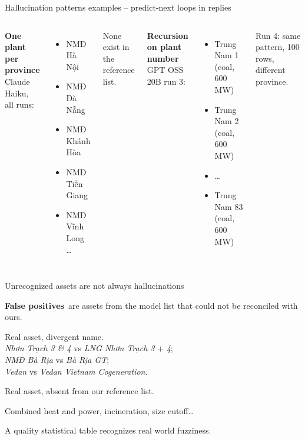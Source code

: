 \documentclass[aspectratio=169]{beamer}
\begin{document}
\begin{frame}{Hallucination patterns examples -- predict-next loops in replies}

\begin{columns}[T]
\textbf{One plant per province}\\
{\small Claude Haiku, all runs:}
\begin{itemize}\setlength\itemsep{1pt}
  \item{\small NMĐ Hà Nội}
  \item{\small NMĐ Đà Nẵng}
  \item{\small NMĐ Khánh Hòa}
  \item{\small NMĐ Tiền Giang}
  \item{\small NMĐ Vĩnh Long \ldots}
\end{itemize}
{\small None exist in the reference list.}

\textbf{Recursion on plant number}\\
{\small GPT OSS 20B run 3:}
\begin{itemize}\setlength\itemsep{1pt}
  \item{\small Trung Nam 1 (coal, 600 MW)}
  \item{\small Trung Nam 2 (coal, 600 MW)}
  \item{\small \ldots}
  \item{\small Trung Nam 83 (coal, 600 MW)}
\end{itemize}
{\small Run 4: same pattern, 100 rows, different province.}
\end{columns}

\end{frame}

\begin{frame}{Unrecognized assets are not always hallucinations}

\textbf{False positives}~are assets from the model list that could not be reconciled with ours.

\medskip
\begin{description}\setlength\itemsep{6pt}
  \item[\textbf{Matcher limitation}] Real asset, divergent name.\\
        \emph{Nhơn Trạch 3 \& 4} vs \emph{LNG Nhơn Trạch 3} + \emph{4};\\
        \emph{NMĐ Bà Rịa} vs \emph{Bà Rịa GT};\\
        \emph{Vedan} vs \emph{Vedan Vietnam Cogeneration}.
  \item[\textbf{Reference limitation}] Real asset, absent from our reference list.
  \item[\textbf{Statistical judgment calls}] Combined heat and power, incineration, size cutoff\ldots
\end{description}

\medskip
\small A quality statistical table recognizes real world fuzziness.

\end{frame}
\end{document}
